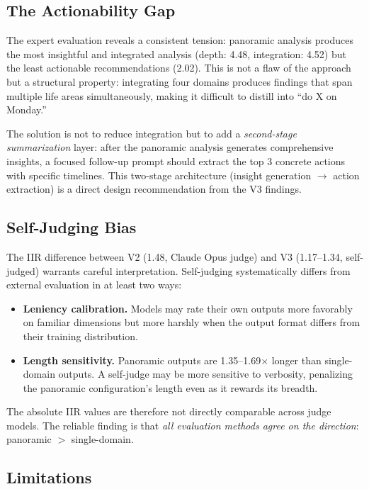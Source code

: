 \documentclass[11pt,a4paper]{article}
\begin{document}
\subsection{The Actionability Gap}

The expert evaluation reveals a consistent tension: panoramic analysis
produces the most insightful and integrated analysis (depth: 4.48, integration:
4.52) but the least actionable recommendations (2.02). This is not a flaw
of the approach but a structural property: integrating four domains produces
findings that span multiple life areas simultaneously, making it difficult
to distill into ``do X on Monday.''

The solution is not to reduce integration but to add a \emph{second-stage
summarization} layer: after the panoramic analysis generates comprehensive
insights, a focused follow-up prompt should extract the top 3 concrete
actions with specific timelines. This two-stage architecture (insight
generation $\to$ action extraction) is a direct design recommendation from
the V3 findings.

\subsection{Self-Judging Bias}

The IIR difference between V2 (1.48, Claude Opus judge) and V3 (1.17--1.34,
self-judged) warrants careful interpretation. Self-judging systematically
differs from external evaluation in at least two ways:

\begin{itemize}[leftmargin=*,itemsep=2pt]
  \item \textbf{Leniency calibration.} Models may rate their own outputs more
    favorably on familiar dimensions but more harshly when the output format
    differs from their training distribution.
  \item \textbf{Length sensitivity.} Panoramic outputs are 1.35--1.69$\times$
    longer than single-domain outputs. A self-judge may be more sensitive to
    verbosity, penalizing the panoramic configuration's length even as it
    rewards its breadth.
\end{itemize}

The absolute IIR values are therefore not directly comparable across judge
models. The reliable finding is that \emph{all evaluation methods agree on
the direction}: panoramic $>$ single-domain.

\subsection{Limitations}
\end{document}
